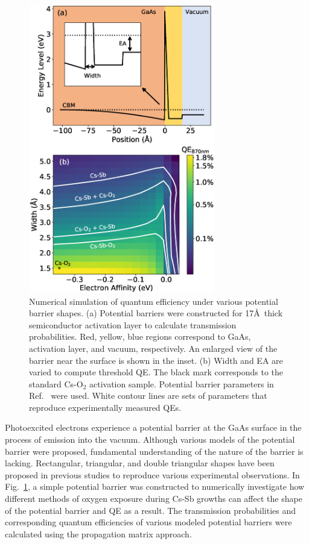 \begin{figure}
	\centering
	\includegraphics*[width=230pt]{figs/CsSbO/pb.eps}
	\caption{Numerical simulation of quantum efficiency under various potential barrier shapes. (a) Potential barriers were constructed for 17\AA\ thick semiconductor activation layer to calculate transmission probabilities. Red, yellow, blue regions correspond to GaAs, activation layer, and vacuum, respectively. An enlarged view of the barrier near the surface is shown in the inset. (b) Width and EA are varied to compute threshold QE. The black mark corresponds to the standard Cs-O$_2$ activation sample. Potential barrier parameters in Ref.~\cite{vergara1999} were used. White contour lines are sets of parameters that reproduce experimentally measured QEs.}
	\label{fig_potentialBarrier}
	
\end{figure}

Photoexcited electrons experience a potential barrier at the GaAs surface in the process of emission into the vacuum. Although various models of the potential barrier were proposed, fundamental understanding of the nature of the barrier is lacking.\cite{karkare2013, jin2014} Rectangular,\cite{fisher1972} triangular,\cite{vergara1999} and double triangular\cite{jin2014} shapes have been proposed in previous studies to reproduce various experimental observations. In Fig.~\ref{fig_potentialBarrier}, a simple potential barrier was constructed to numerically investigate how different methods of oxygen exposure during Cs-Sb growths can affect the shape of the potential barrier and QE as a result. The transmission probabilities and corresponding quantum efficiencies of various modeled potential barriers were calculated using the propagation matrix approach.\cite{karkare2013,levi2006applied,gilmore2004elementary}

